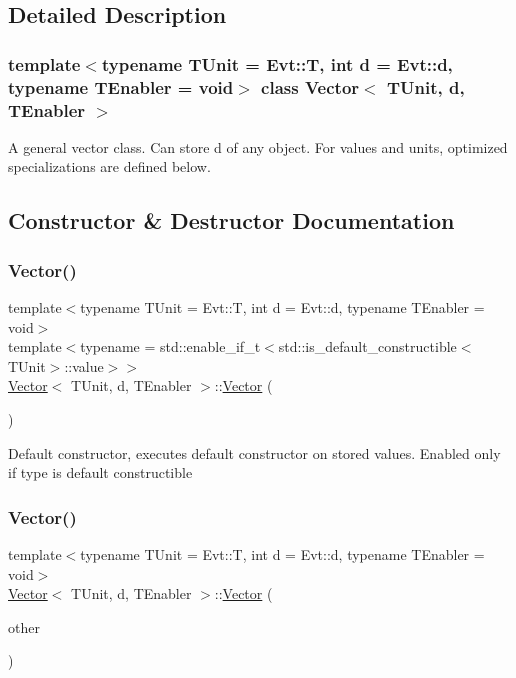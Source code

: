 \subsection{Detailed Description}
\subsubsection*{template$<$typename T\+Unit = Evt\+::T, int d = Evt\+::d, typename T\+Enabler = void$>$\newline
class Vector$<$ T\+Unit, d, T\+Enabler $>$}

A general vector class. Can store d of any object. For values and units, optimized specializations are defined below. 

\subsection{Constructor \& Destructor Documentation}
\hypertarget{classVector_a9861ef252299f5ec6ba668fdfb58bdac}{}\label{classVector_a9861ef252299f5ec6ba668fdfb58bdac} 
\subsubsection{\texorpdfstring{Vector()}{Vector()}\hspace{0.1cm}{\footnotesize\ttfamily [1/3]}}
{\footnotesize\ttfamily template$<$typename T\+Unit = Evt\+::T, int d = Evt\+::d, typename T\+Enabler = void$>$ \\
template$<$typename  = std\+::enable\+\_\+if\+\_\+t$<$std\+::is\+\_\+default\+\_\+constructible$<$\+T\+Unit$>$\+::value$>$$>$ \\
\hyperlink{classVector}{Vector}$<$ T\+Unit, d, T\+Enabler $>$\+::\hyperlink{classVector}{Vector} (\begin{DoxyParamCaption}{ }\end{DoxyParamCaption})\hspace{0.3cm}{\ttfamily [inline]}}

Default constructor, executes default constructor on stored values. Enabled only if type is default constructible \hypertarget{classVector_a22750ab935dc70912a8ce6f144077991}{}\label{classVector_a22750ab935dc70912a8ce6f144077991} 
\subsubsection{\texorpdfstring{Vector()}{Vector()}\hspace{0.1cm}{\footnotesize\ttfamily [2/3]}}
{\footnotesize\ttfamily template$<$typename T\+Unit = Evt\+::T, int d = Evt\+::d, typename T\+Enabler = void$>$ \\
\hyperlink{classVector}{Vector}$<$ T\+Unit, d, T\+Enabler $>$\+::\hyperlink{classVector}{Vector} (\begin{DoxyParamCaption}\item[{\hyperlink{classVector}{Vector}$<$ T\+Unit, d, T\+Enabler $>$ \&\&}]{other }\end{DoxyParamCaption})\hspace{0.3cm}{\ttfamily [inline]}}

